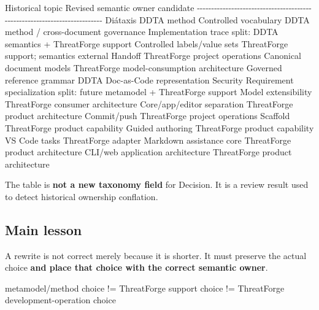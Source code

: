 \documentclass[
  10pt,
]{article}
\newenvironment{Shaded}{}{}
\newcommand{\NormalTok}[1]{#1}
\begin{document}
\begin{Shaded}
\begin{Highlighting}[]
\NormalTok{Historical topic                         Revised semantic owner candidate}
\NormalTok{{-}{-}{-}{-}{-}{-}{-}{-}{-}{-}{-}{-}{-}{-}{-}{-}{-}{-}{-}{-}{-}{-}{-}{-}{-}{-}{-}{-}{-}{-}{-}{-}{-}{-}{-}{-}{-}{-}{-}{-}{-}{-}{-}{-}{-}{-}{-}{-}{-}{-}{-}{-}{-}{-}{-}{-}{-}{-}{-}{-}{-}{-}{-}{-}{-}{-}{-}{-}{-}{-}{-}{-}{-}{-}}
\NormalTok{Diátaxis                                DDTA method}
\NormalTok{Controlled vocabulary                  DDTA method / cross{-}document governance}
\NormalTok{Implementation trace                   split: DDTA semantics + ThreatForge support}
\NormalTok{Controlled labels/value sets           ThreatForge support; semantics external}
\NormalTok{Handoff                                 ThreatForge project operations}
\NormalTok{Canonical document models              ThreatForge model{-}consumption architecture}
\NormalTok{Governed reference grammar             DDTA Doc{-}as{-}Code representation}
\NormalTok{Security Requirement specialization    split: future metamodel + ThreatForge support}
\NormalTok{Model extensibility                     ThreatForge consumer architecture}
\NormalTok{Core/app/editor separation              ThreatForge product architecture}
\NormalTok{Commit/push                             ThreatForge project operations}
\NormalTok{Scaffold                                ThreatForge product capability}
\NormalTok{Guided authoring                        ThreatForge product capability}
\NormalTok{VS Code tasks                           ThreatForge adapter}
\NormalTok{Markdown assistance core                ThreatForge product architecture}
\NormalTok{CLI/web application architecture        ThreatForge product architecture}
\end{Highlighting}
\end{Shaded}

The table is \textbf{not a new taxonomy field} for Decision. It is a
review result used to detect historical ownership conflation.

\subsection{Main lesson}\label{main-lesson}

A rewrite is not correct merely because it is shorter. It must preserve
the actual choice \textbf{and place that choice with the correct
semantic owner}.

\begin{Shaded}
\begin{Highlighting}[]
\NormalTok{metamodel/method choice}
\NormalTok{        !=}
\NormalTok{ThreatForge support choice}
\NormalTok{        !=}
\NormalTok{ThreatForge development{-}operation choice}
\end{Highlighting}
\end{Shaded}
\end{document}

